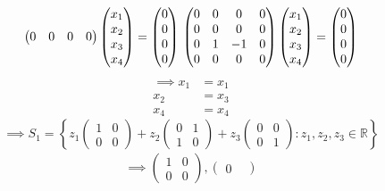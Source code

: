 \begin{enumerate}
\begin{itemize}
\begin{equation}
\begin{pmatrix}
0 & 0 & 0 & 0
\end{pmatrix}
\begin{pmatrix}
x_1\\x_2\\x_3\\x_4
\end{pmatrix}
=\begin{pmatrix}
0\\0\\0\\0
\end{pmatrix}\\
\begin{pmatrix}
0 & 0 & 0 & 0\\
0 & 0 & 0 & 0\\
0 & 1 & -1 & 0\\
0 & 0 & 0 & 0
\end{pmatrix}
\begin{pmatrix}
x_1\\x_2\\x_3\\x_4
\end{pmatrix}
=\begin{pmatrix}
0\\0\\0\\0
\end{pmatrix}
\end{equation}
\begin{align}
\implies x_1 &= x_1\\
x_2 &=x_3\\
x_4 &= x_4
\end{align}
\begin{equation}
\implies S_1 =
\left\{z_1\begin{pmatrix}1&0\\0&0\end{pmatrix}+z_2\begin{pmatrix}0 &
    1\\1&0\end{pmatrix} +z_3\begin{pmatrix}0 & 0\\0 &
    1\end{pmatrix}\colon z_1,z_2,z_3 \in \mathbb{R}\right\}
\end{equation}
\begin{gather}
\implies \begin{pmatrix}1&0\\0&0\end{pmatrix},\begin{pmatrix}0 &

\end{pmatrix}
\end{gather}
\end{itemize}
\end{enumerate}
